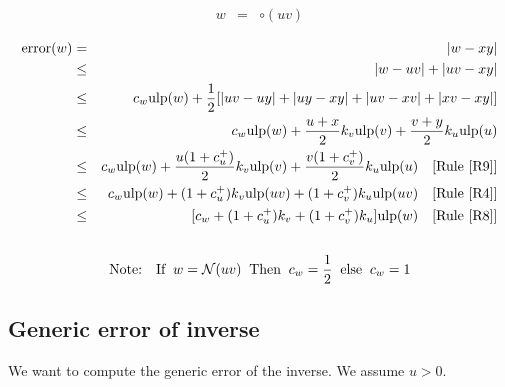 \documentclass[12pt]{amsart}
\def\ulp{{\rm ulp}}
\def\N{{\mathcal N}}
\newcommand{\U}[1]{\quad \mbox{[Rule~\ref{#1}]}}
\DeclareMathOperator{\error}{error}
\begin{document}
\begin{eqnarray}\nonumber
w&=&\circ(uv) \\\nonumber
\end{eqnarray}
\begin{eqnarray}\nonumber
\error(w)& = &|w - xy| \\\nonumber
& \leq &|w - u v| +|u v - x y| \\\nonumber
& \leq & c_w \ulp(w) +  \frac{1}{2} [|u v-u y|+|u y-x y|+|u v-x v|+|x v-x y|]\\\nonumber
& \leq & c_w \ulp(w) +  \frac{u+x}{2} k_v \ulp(v) + \frac{v+y}{2} k_u \ulp(u)\\\nonumber
& \leq & c_w \ulp(w) +  \frac{u(1+c_u^+)}{2} k_v \ulp(v) + \frac{v(1+c_v^+)}{2} k_u \ulp(u) \U{R9}\\\nonumber
& \leq & c_w \ulp(w) +  (1+c_u^+) k_v \ulp(uv) + (1+c_v^+) k_u \ulp(uv) \U{R4}\\\nonumber
& \leq & [ c_w +  (1+c_u^+) k_v + (1+c_v^+) k_u ] \ulp(w)\U{R8}\\\nonumber
\end{eqnarray}
\begin{eqnarray}\nonumber
\textnormal{Note:}&&\textnormal{If}\;\; w=\N(uv) \;\;\textnormal{Then}\;\; c_w =\frac{1}{2} \;\;\textnormal{else}\;\; c_w =1
\end{eqnarray}

\subsection{Generic error of inverse}\label{generic:inv}

We want to compute the generic error of the inverse.
We assume $u > 0$.
\end{document}
